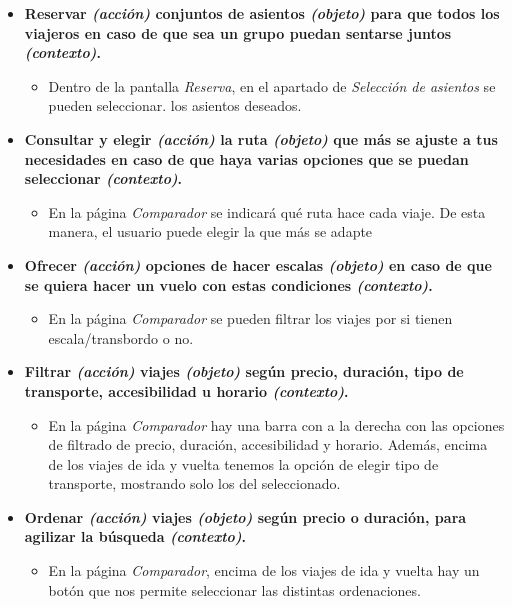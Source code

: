 \begin{itemize}
    \item \textbf{Reservar \textit{(acción)} conjuntos de asientos \textit{(objeto)} para que todos los viajeros en caso de que sea un grupo puedan
        sentarse juntos \textit{(contexto)}.}
        \begin{itemize}
            \item Dentro de la pantalla \textit{Reserva}, en el apartado de \textit{Selección de asientos} se pueden seleccionar.
                los asientos deseados.
        \end{itemize}

    \item \textbf{Consultar y elegir \textit{(acción)} la ruta \textit{(objeto)} que más se ajuste a tus necesidades en caso de que haya varias opciones que se puedan seleccionar \textit{(contexto)}.}
        \begin{itemize}
            \item En la página \textit{Comparador} se indicará qué ruta hace cada viaje. De esta manera, el usuario puede elegir la que más se adapte
        \end{itemize}

    \item \textbf{Ofrecer \textit{(acción)} opciones de hacer escalas \textit{(objeto)} en caso de que se quiera hacer un vuelo con estas condiciones \textit{(contexto)}.}
        \begin{itemize}
            \item En la página \textit{Comparador} se pueden filtrar los viajes por si tienen escala/transbordo o no.
        \end{itemize}

    \item \textbf{Filtrar \textit{(acción)} viajes \textit{(objeto)} según precio, duración, tipo de transporte, accesibilidad u horario \textit{(contexto)}.}
        \begin{itemize}
            \item En la página \textit{Comparador} hay una barra con a la derecha con las opciones de filtrado de precio, duración, accesibilidad y horario. Además, encima de los viajes
                de ida y vuelta tenemos la opción de elegir tipo de transporte, mostrando solo los del seleccionado.
        \end{itemize}

    \item \textbf{Ordenar \textit{(acción)} viajes \textit{(objeto)} según precio o duración, para agilizar la búsqueda \textit{(contexto)}.}
        \begin{itemize}
            \item En la página \textit{Comparador}, encima de los viajes de ida y vuelta hay un botón que nos permite seleccionar las distintas ordenaciones.
        \end{itemize}
\end{itemize}